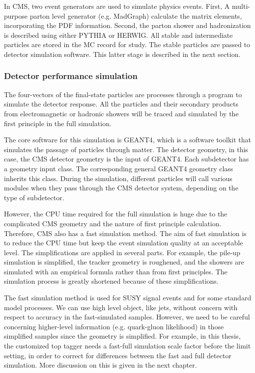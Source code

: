 In CMS, two event generators are used to simulate physics events. First, A multi-purpose parton level generator (e.g. MadGraph\cite{Alwall:2011uj}) calculate the matrix elements, incorporating the PDF information. Second, the parton shower and hadronization is described using either PYTHIA\cite{Sjostrand:2014zea} or HERWIG\cite{Bellm:2015jjp}. All stable and intermediate particles are stored in the MC record for study. The stable particles are passed to detector simulation software. This latter stage is described in the next section. 

\subsubsection{Detector performance simulation}

The four-vectors of the final-state particles are processes through a program to simulate the detector response. All the particles and their secondary products from electromagnetic or hadronic showers will be traced and simulated by the first principle in the full simulation. 

The core software for this simulation is GEANT4\cite{Agostinelli:2002hh}, which is a software toolkit that simulates the passage of particles through matter. The detector geometry, in this case, the CMS detector geometry\cite{Lefebure:1999wja} is the input of GEANT4. Each subdetector has a geometry input class. The corresponding general GEANT4 geometry class inherits this class. During the simulation, different particles will call various modules when they pass through the CMS detector system, depending on the type of subdetector. 

However, the CPU time required for the full simulation is huge due to the complicated CMS geometry and the nature of first principle calculation. Therefore, CMS also has a fast simulation method\cite{1742-6596-396-6-062016}. The aim of fast simulation is to reduce the CPU time but keep the event simulation quality at an acceptable level. The simplifications are applied in several parts. For example, the pile-up simulation is simplified, the tracker geometry is roughened, and the showers are simulated with an empirical formula rather than from first principles. The simulation process is greatly shortened because of these simplifications. 

The fast simulation method is used for SUSY signal events and for some standard model processes. We can use high level object, like jets, without concern with respect to accuracy in the fast-simulated samples. However, we need to be careful concerning higher-level information (e.g. quark-gluon likelihood) in those simplified samples since the geometry is simplified. For example, in this thesis, the customized top tagger needs a fast-full simulation scale factor before the limit setting, in order to correct for differences between the fast and full detector simulation. More discussion on this is given in the next chapter. 
